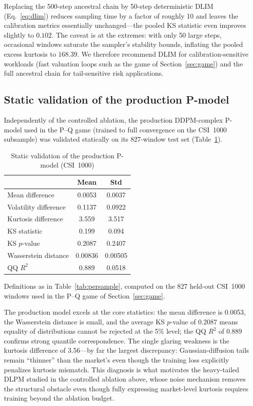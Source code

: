 \documentclass[12pt,letterpaper]{article}
\newcommand{\dlimKurt}{$168.39$} \newcommand{\dlimKS}{$0.102$} \newcommand{\dlimSpeedup}{10}
\newcommand{\tabnote}[1]{\begin{minipage}{\linewidth}\vspace{4pt}\footnotesize\singlespacing #1\end{minipage}}
\begin{document}
Replacing the 500-step ancestral chain by 50-step deterministic DLIM
(Eq.~\ref{eq:dlim}) reduces sampling time by a factor of roughly
\dlimSpeedup{} and leaves the calibration metrics essentially
unchanged---the pooled KS statistic even improves slightly to \dlimKS{}.
The caveat is at the extremes: with only 50 large steps, occasional windows
saturate the sampler's stability bounds, inflating the pooled excess
kurtosis to \dlimKurt{}. We therefore recommend DLIM for
calibration-sensitive workloads (fast valuation loops such as the game of
Section~\ref{sec:game}) and the full ancestral chain for tail-sensitive
risk applications.

\subsection{Static validation of the production P-model}

Independently of the controlled ablation, the production DDPM-complex
P-model used in the P--Q game (trained to full convergence on the CSI~1000
subsample) was validated statically on its 827-window test set
(Table~\ref{tab:static}).

\begin{table}[ht]
\singlespacing
\centering
\caption{Static validation of the production P-model (CSI~1000)}
\label{tab:static}
\begin{tabular}{lcc}
\toprule
 & Mean & Std \\
\midrule
Mean difference       & 0.0053  & 0.0037 \\
Volatility difference & 0.1137  & 0.0922 \\
Kurtosis difference   & 3.559   & 3.517  \\
KS statistic          & 0.199   & 0.094  \\
KS $p$-value          & 0.2087  & 0.2407 \\
Wasserstein distance  & 0.00836 & 0.00505 \\
QQ $R^2$              & 0.889   & 0.0518 \\
\bottomrule
\end{tabular}
\tabnote{Definitions as in Table~\ref{tab:persample}, computed on the 827
held-out CSI~1000 windows used in the P--Q game of Section~\ref{sec:game}.}
\end{table}

The production model excels at the core statistics: the mean difference is
0.0053, the Wasserstein distance is small, and the average KS $p$-value of
0.2087 means equality of distributions cannot be rejected at the 5\% level;
the QQ $R^2$ of 0.889 confirms strong quantile correspondence. The single
glaring weakness is the kurtosis difference of 3.56---by far the largest
discrepancy: Gaussian-diffusion tails remain ``thinner'' than the market's
even though the training loss explicitly penalizes kurtosis mismatch. This
diagnosis is what motivates the heavy-tailed DLPM studied in the controlled
ablation above, whose noise mechanism removes the structural obstacle even
though fully expressing market-level kurtosis requires training beyond the
ablation budget.
\end{document}
